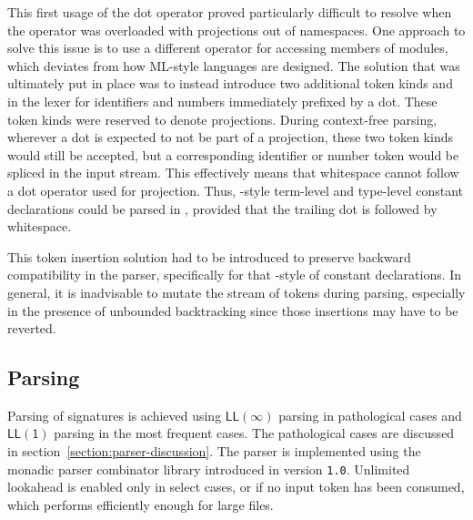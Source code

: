This first usage of the dot operator proved particularly difficult to resolve when the operator was overloaded with projections out of namespaces.
One approach to solve this issue is to use a different operator for accessing members of modules, which deviates from how \textsc{ML}-style languages are designed.
The solution that was ultimately put in place was to instead introduce two additional token kinds  and  in the lexer for identifiers and numbers immediately prefixed by a dot.
These token kinds were reserved to denote projections.
During context-free parsing, wherever a dot is expected to not be part of a projection, these two token kinds would still be accepted, but a corresponding identifier or number token would be spliced in the input stream.
This effectively means that whitespace cannot follow a dot operator used for projection.
Thus, \Twelf-style \LF term-level and type-level constant declarations could be parsed in \Beluga, provided that the trailing dot is followed by whitespace.

This token insertion solution had to be introduced to preserve backward compatibility in the parser, specifically for that \Twelf-style of constant declarations.
In general, it is inadvisable to mutate the stream of tokens during parsing, especially in the presence of unbounded backtracking since those insertions may have to be reverted.

\subsection{Parsing}

Parsing of \Beluga signatures is achieved using $ \mathsf{LL(\infty)} $ parsing in pathological cases and $ \mathsf{LL(1)} $ parsing in the most frequent cases.
The pathological cases are discussed in section~\ref{section:parser-discussion}.
The parser is implemented using the monadic parser combinator library introduced in \Beluga version \texttt{1.0}.
Unlimited lookahead is enabled only in select cases, or if no input token has been consumed, which performs efficiently enough for large \Beluga files.

